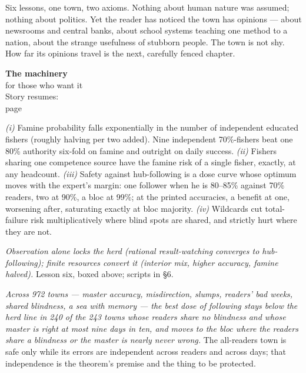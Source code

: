 Six lessons, one town, two axioms. Nothing about human nature was
assumed; nothing about politics. Yet the reader has noticed the town
has opinions --- about newsrooms and central banks, about school systems
teaching one method to a nation, about the strange usefulness of
stubborn people. The town is not shy. How far its opinions travel is
the next, carefully fenced chapter.

\begin{machinery}{\textbf{The machinery}\\for those who want it\\[3pt]{\color{muted}Story resumes:\\page~\pageref{ch12}}}



\label{claim-20}

\noindent \emph{(i)} Famine probability
falls exponentially in the number of independent educated fishers
(roughly halving per two added). Nine independent 70\%-fishers beat one
80\% authority six-fold on famine and outright on daily success.
\emph{(ii)} Fishers sharing one competence source have the famine risk of a
single fisher, exactly, at any headcount. \emph{(iii)} Safety against
hub-following is a dose curve whose optimum moves with the expert's
margin: one follower when he is 80--85\% against 70\% readers, two at
90\%, a bloc at 99\%; at the printed accuracies, a benefit at one,
worsening after, saturating exactly at bloc majority. \emph{(iv)} Wildcards cut
total-failure risk multiplicatively where blind spots are shared, and
strictly hurt where they are not.


\label{claim-21}

\noindent \emph{Observation alone locks the
herd (rational result-watching converges to hub-following); finite
resources convert it (interior mix, higher accuracy, famine halved).}
Lesson six, boxed above; scripts in §6.


\label{claim-22}

\noindent \emph{Across 972 towns ---
master accuracy, misdirection, slumps, readers' bad weeks, shared
blindness, a sea with memory --- the best dose of following stays below
the herd line in 240 of the 243 towns whose readers share no blindness
and whose master is right at most nine days in ten, and moves to the
bloc where the readers share a blindness or the master is nearly never
wrong.} The all-readers town is safe only while its
errors are independent across readers and across days; that
independence is the theorem's premise and the thing to be protected.


\end{machinery}
